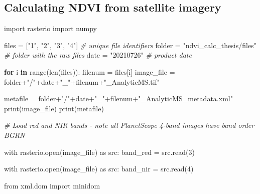 \documentclass[12pt,twoside]{reedthesis}
\newenvironment{Shaded}{\begin{snugshade}}{\end{snugshade}}
\newcommand{\CommentTok}[1]{\textcolor[rgb]{0.56,0.35,0.01}{\textit{#1}}}
\newcommand{\ControlFlowTok}[1]{\textcolor[rgb]{0.13,0.29,0.53}{\textbf{#1}}}
\newcommand{\DecValTok}[1]{\textcolor[rgb]{0.00,0.00,0.81}{#1}}
\newcommand{\FunctionTok}[1]{\textcolor[rgb]{0.00,0.00,0.00}{#1}}
\newcommand{\NormalTok}[1]{#1}
\newcommand{\OtherTok}[1]{\textcolor[rgb]{0.56,0.35,0.01}{#1}}
\newcommand{\SpecialCharTok}[1]{\textcolor[rgb]{0.00,0.00,0.00}{#1}}
\newcommand{\StringTok}[1]{\textcolor[rgb]{0.31,0.60,0.02}{#1}}
\begin{document}
\hypertarget{calculating-ndvi-from-satellite-imagery}{%
\subsection*{Calculating NDVI from satellite imagery}\label{calculating-ndvi-from-satellite-imagery}}
\begin{Shaded}
\begin{Highlighting}[]
\NormalTok{import rasterio}
\NormalTok{import numpy}

\NormalTok{files }\OtherTok{=}\NormalTok{ [}\StringTok{"1"}\NormalTok{, }\StringTok{"2"}\NormalTok{, }\StringTok{"3"}\NormalTok{, }\StringTok{"4"}\NormalTok{] }\CommentTok{\# unique file identifiers}
\NormalTok{folder }\OtherTok{=} \StringTok{"ndvi\_calc\_thesis/files"} \CommentTok{\# folder with the raw files}
\NormalTok{date }\OtherTok{=} \StringTok{"20210726"} \CommentTok{\# product date}


\ControlFlowTok{for}\NormalTok{ i }\ControlFlowTok{in} \FunctionTok{range}\NormalTok{(}\FunctionTok{len}\NormalTok{(files))}\SpecialCharTok{:}
\NormalTok{    filenum }\OtherTok{=}\NormalTok{ files[i]}
\NormalTok{    image\_file }\OtherTok{=}\NormalTok{ folder}\SpecialCharTok{+}\StringTok{"/"}\SpecialCharTok{+}\NormalTok{date}\SpecialCharTok{+}\StringTok{"\_"}\SpecialCharTok{+}\NormalTok{filenum}\SpecialCharTok{+}\StringTok{"\_AnalyticMS.tif"}

\NormalTok{    metafile }\OtherTok{=}\NormalTok{ folder}\SpecialCharTok{+}\StringTok{"/"}\SpecialCharTok{+}\NormalTok{date}\SpecialCharTok{+}\StringTok{"\_"}\SpecialCharTok{+}\NormalTok{filenum}\SpecialCharTok{+}\StringTok{"\_AnalyticMS\_metadata.xml"}
    \FunctionTok{print}\NormalTok{(image\_file)}
    \FunctionTok{print}\NormalTok{(metafile)}

    \CommentTok{\# Load red and NIR bands {-} note all PlanetScope 4{-}band images have band order BGRN}

\NormalTok{    with }\FunctionTok{rasterio.open}\NormalTok{(image\_file) as src}\SpecialCharTok{:}
\NormalTok{        band\_red }\OtherTok{=} \FunctionTok{src.read}\NormalTok{(}\DecValTok{3}\NormalTok{)}

\NormalTok{    with }\FunctionTok{rasterio.open}\NormalTok{(image\_file) as src}\SpecialCharTok{:}
\NormalTok{        band\_nir }\OtherTok{=} \FunctionTok{src.read}\NormalTok{(}\DecValTok{4}\NormalTok{)}

\NormalTok{    from xml.dom import minidom}


\end{Highlighting}
\end{Shaded}
\end{document}
